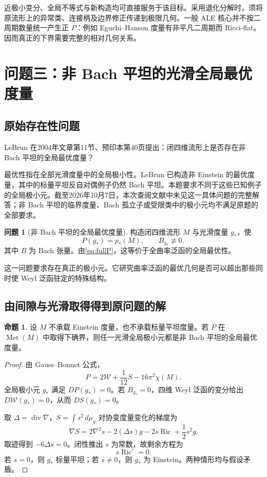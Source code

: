 \documentclass[11pt,a4paper]{article}
\newcommand{\Ric}{\operatorname{Ric}}
\newcommand{\Met}{\operatorname{Met}}
\newcommand{\dd}{\,d\mu_g}
\theoremstyle{definition}
\newtheorem{problem}{问题}[section]
\newtheorem{proposition}{命题}[section]
\numberwithin{equation}{section}
\begin{document}
近极小变分、全局不等式与新构造均可直接服务于该目标。采用退化分解时，须将原流形上的异常类、连接柄及边界修正传递到极限几何。一般 ALE 核心并不按二周期数量统一产生正 $P$：例如 Eguchi--Hanson 度量有非平凡二周期而 Ricci-flat。因而真正的下界需要完整的相对几何关系。

\section{问题三：非 Bach 平坦的光滑全局最优度量}
\label{sec:bach}

\subsection{原始存在性问题}
LeBrun 在2004年文章第11节、预印本第40页提出：闭四维流形上是否存在非 Bach 平坦的全局最优度量\cite{LeBrun2004}？

最优性指在全部光滑度量中的全局极小性。LeBrun 已构造非 Einstein 的最优度量，其中的标量平坦反自对偶例子仍然 Bach 平坦。本题要求不同于这些已知例子的全局极小元。截至2026年10月7日，本次查阅文献中未见这一具体问题的完整解答；非 Bach 平坦的临界度量、Bach 孤立子或受限类中的极小元均不满足原题的全部要求。

\begin{problem}[非 Bach 平坦的全局最优度量]
构造闭四维流形 $M$ 与光滑度量 $g_*$，使
\[
P(g_*)=p_*(M),\qquad B_{g_*}\not\equiv0,
\]
其中 $B$ 为 Bach 张量。由\eqref{eq:fullP}，这等价于全曲率泛函的全局最优性。
\end{problem}

这一问题要求存在真正的极小元。它研究曲率泛函的最优几何是否可以超出那些同时使 Weyl 泛函驻定的特殊结构。

\subsection{由间隙与光滑取得得到原问题的解}
\begin{proposition}\label{prop:nonbach}
设 $M$ 不承载 Einstein 度量，也不承载标量平坦度量。若 $P$ 在 $\Met(M)$ 中取得下确界，则任一光滑全局极小元都是非 Bach 平坦的全局最优度量。
\end{proposition}
\begin{proof}
由 Gauss--Bonnet 公式，
\begin{equation}
P=2\mathcal W+\frac1{12}S-16\pi^2\chi(M).\label{eq:PWS}
\end{equation}
全局极小元 $g_*$ 满足 $DP(g_*)=0$。若 $B_{g_*}=0$，四维 Weyl 泛函的变分给出 $D\mathcal W(g_*)=0$，从而 $DS(g_*)=0$。

取 $\Delta=\operatorname{div}\nabla$，$S=\int s^2\dd$ 对协变度量变化的梯度为
\begin{equation}
\nabla S=2\nabla^2s-2(\Delta s)g-2s\Ric+\frac12s^2g.\label{eq:Sgradient}
\end{equation}
取迹得到 $-6\Delta s=0$。闭性推出 $s$ 为常数，故剩余方程为
\[
s\Ric^\circ=0.
\]
若 $s=0$，则 $g_*$ 标量平坦；若 $s\ne0$，则 $g_*$ 为 Einstein。两种情形均与假设矛盾。
\end{proof}
\end{document}
